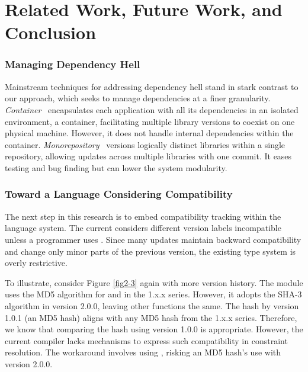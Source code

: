 
\section{Related Work, Future Work, and Conclusion} %
\label{conclusion} %

\subsubsection{Managing Dependency Hell}
Mainstream techniques for addressing dependency hell stand in stark contrast to our approach, which seeks to manage dependencies at a finer granularity.
\emph{Container}~\cite{container:docker} encapsulates each application with all its dependencies in an isolated environment, a container, facilitating multiple library versions to coexist on one physical machine. However, it does not handle internal dependencies within the container.
\emph{Monorepository}~\cite{monorepo:google,monorepo:facebook} versions logically distinct libraries within a single repository, allowing updates across multiple libraries with one commit. It eases testing and bug finding but can lower the system modularity.

\subsubsection{Toward a Language Considering Compatibility}
The next step in this research is to embed compatibility tracking within the language system. The current \mylang{} considers different version labels incompatible unless a programmer uses \texttt{}. Since many updates maintain backward compatibility and change only minor parts of the previous version, the existing type system is overly restrictive.

To illustrate, consider Figure \ref{fig2-3} again with more version history. The module  uses the MD5 algorithm for  and  in the 1.x.x series. However, it adopts the SHA-3 algorithm in version 2.0.0, leaving other functions the same. The hash by  version 1.0.1 (an MD5 hash) aligns with any MD5 hash from the 1.x.x series. Therefore, we know that comparing the hash using  version 1.0.0 is appropriate. However, the current \mylang{} compiler lacks mechanisms to express such compatibility in constraint resolution. The workaround involves using \texttt{}, risking an MD5 hash's use with  version 2.0.0.


